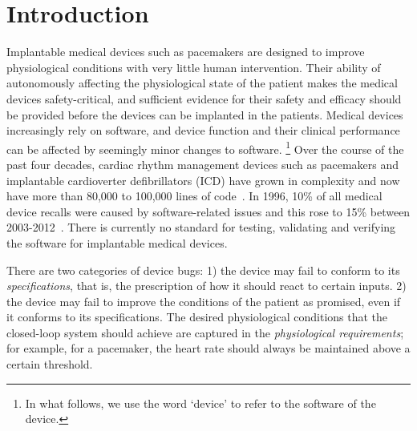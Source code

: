 \section{Introduction}
\label{introduction}

Implantable medical devices such as pacemakers are designed to improve physiological conditions with very little human intervention. 
Their ability of autonomously affecting the physiological state of the patient makes the medical devices safety-critical, and sufficient evidence for their safety and efficacy should be provided before the devices can be implanted in the patients. Medical devices increasingly rely on software, and device function and their clinical performance can be affected by seemingly minor changes to software.
\footnote{In what follows, we use the word `device' to refer to the software of the device.}
Over the course of the past four decades, cardiac rhythm management devices such as pacemakers and implantable cardioverter defibrillators (ICD) have grown in complexity and now have more than 80,000 to 100,000 lines of code~\cite{pauljones}. In 1996, 10\% of all medical device recalls were caused by software-related issues and this rose to 15\% between 2003-2012~\cite{recall_stats, killedbycode}. There is currently no standard for testing, validating and verifying the software for implantable medical devices.


There are two categories of device bugs: 
1) the device may fail to conform to its \emph{specifications}, that is, the prescription of how it should react to certain inputs.  
2) the device may fail to improve the conditions of the patient as promised, even if it conforms to its specifications. 
The desired physiological conditions that the closed-loop system should achieve are captured in the \emph{physiological requirements}; for example, for a pacemaker, the heart rate should always be maintained above a certain threshold. 

